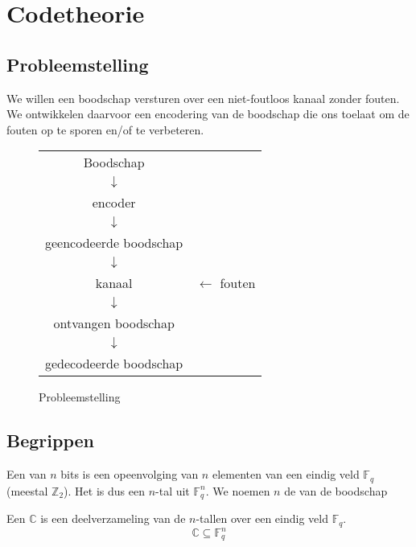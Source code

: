 \documentclass[main.tex]{subfiles}
\begin{document}
\chapter{Codetheorie}
\label{cha:codetheorie}

\section{Probleemstelling}

We willen een boodschap versturen over een niet-foutloos kanaal zonder fouten.
We ontwikkelen daarvoor een encodering van de boodschap die ons toelaat om de fouten op te sporen en/of te verbeteren.

\begin{figure}[H]
  \centering
  \begin{tabular}{cl}
    Boodschap\\
    $\downarrow$\\
    encoder \\
    $\downarrow$\\
    geencodeerde boodschap\\
    $\downarrow$\\
    kanaal &$\leftarrow$ fouten\\
    $\downarrow$\\
    ontvangen boodschap\\
    $\downarrow$\\
    gedecodeerde boodschap
  \end{tabular}
  \caption{Probleemstelling}
  \label{fig:probleemstelling}
\end{figure}

\section{Begrippen}

\begin{de}
  Een  van $n$ bits is een opeenvolging van $n$ elementen van een eindig veld $\mathbb{F}_{q}$ (meestal $\mathbb{Z}_{2}$).
  Het is dus een $n$-tal uit $\mathbb{F}_{q}^{n}$.
  We noemen $n$ de  van de boodschap
\end{de}


\begin{de}
  Een  $\mathbb{C}$ is een deelverzameling van de $n$-tallen over een eindig veld $\mathbb{F}_{q}$.
  \[ \mathbb{C} \subseteq \mathbb{F}_{q}^{n} \]
\end{de}
\end{document}
